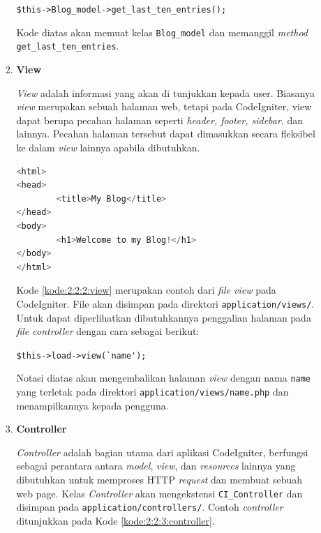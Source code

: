 \documentclass[a4paper,twoside]{article}
\begin{document}
\begin{enumerate}
\begin{itemize}
\begin{enumerate}
			                  \begin{center}
				                  \verb|$this->Blog_model->get_last_ten_entries();|
			                  \end{center}

			                  Kode diatas akan memuat kelas \verb|Blog_model| dan memanggil \textit{method} \verb|get_last_ten_entries|.

			            \item \textbf{View}
			                  \label{sub:2:2:2:View}

			                  \textit{View} adalah informasi yang akan di tunjukkan kepada user. Biasanya \textit{view} merupakan sebuah halaman web, tetapi pada CodeIgniter, view dapat berupa pecahan halaman seperti \textit{header, footer, sidebar}, dan lainnya. Pecahan halaman tersebut dapat dimasukkan secara fleksibel ke dalam \textit{view} lainnya apabila dibutuhkan.

			                  \begin{lstlisting}[language=php, caption={Contoh \textit{view}}, label={kode:2:2:2:view}]
<html>
<head>
        <title>My Blog</title>
</head>
<body>
        <h1>Welcome to my Blog!</h1>
</body>
</html>
					\end{lstlisting}

			                  Kode \ref{kode:2:2:2:view} merupakan contoh dari \textit{file view} pada CodeIgniter. File akan disimpan pada direktori \verb|application/views/|. Untuk dapat diperlihatkan dibutuhkannya penggalian halaman pada \textit{file controller} dengan cara sebagai berikut:

			                  \vspace{0.25cm}
			                  \begin{center}
				                  \verb|$this->load->view(`name');|
			                  \end{center}
			                  \vspace{0.25cm}

			                  Notasi diatas akan mengembalikan halaman \textit{view} dengan nama \verb|name| yang terletak pada direktori \verb|application/views/name.php| dan menampilkannya kepada pengguna.


			            \item \textbf{Controller}
			                  \label{sub:2:2:3:Controller}

			                  \textit{Controller} adalah bagian utama dari aplikasi CodeIgniter, berfungsi sebagai perantara antara \textit{model}, \textit{view}, dan \textit{resources} lainnya yang dibutuhkan untuk memproses HTTP \textit{request} dan membuat sebuah web page. Kelas \textit{Controller} akan mengekstensi \verb|CI_Controller| dan disimpan pada \verb|application/controllers/|. Contoh \textit{controller} ditunjukkan pada Kode \ref{kode:2:2:3:controller}.


\end{enumerate}
\end{itemize}
\end{enumerate}
\end{document}
